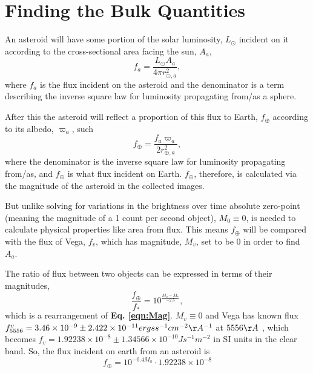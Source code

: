 \documentclass[10pt,twocolumn]{revtex4}    %
\newcommand*{\astrosun}{{\odot}}
\newcommand*{\earth}{{\oplus}}
\begin{document}
\section{Finding the Bulk Quantities}\label{ssec:findVM}


An asteroid will have some portion of the solar luminosity, $L_\astrosun$ incident on it according to the cross-sectional area facing the sun, $A_{a}$,
\begin{equation}\label{eqn:fluxAsteroid}
    f_{a} = \frac{ L_\astrosun A_{a}}{4\pi r^2_{\astrosun,a}},
\end{equation}
where $f_a$ is the flux incident on the asteroid and the denominator is a term describing the inverse square law for luminosity propagating from/as a sphere.

After this the asteroid will reflect a proportion of this flux to Earth, $f_\earth$ according to its albedo, $\varpi_{a}$, such
\begin{equation}\label{eqn:fluxEarth}
    f_\earth = \frac{f_{a} \varpi_{a}}{2r^2_{\earth,a}},
\end{equation}
where the denominator is the inverse square law for luminosity propagating from/as, and $f_\earth$ is what flux incident on Earth. $f_\earth$, therefore, is calculated via the magnitude of the asteroid in the collected images. 

But unlike solving for variations in the brightness over time absolute zero-point (meaning the magnitude of a 1 count per second object), $M_0 \equiv 0$, is needed to calculate physical properties like area from flux. This means $f_\earth$ will be compared with the flux of Vega, $f_v$, which has magnitude, $M_v$, set to be $0$ in order to find $A_a$.

The ratio of flux between two objects can be expressed in terms of their magnitudes,
\begin{equation}\label{eqn:fluxRatio}
    \frac{f_{\earth}}{f_{*}} = 10^{\frac{M_{a} - M_{*}}{-2.5}},
\end{equation}
which is a rearrangement of \textbf{Eq. \ref{eqn:Mag}}. 
$M_v \equiv 0$ and Vega has known flux $f^v_{5556} = 3.46\times10^{-9} \pm	2.422\times10^{-11}
ergs s^{-1} cm^{-2} \AA^{-1}$ at $5556 \AA$ \textbf{\cite{VegaMag0}}, which becomes $f_v = 1.92238\times10^{-8}\pm 1.34566\times10^{-10} J s^{-1} m^{-2}$ in SI units in the clear band. 
So, the flux incident on earth from an asteroid is
\begin{equation}
    \label{eqn:fluxOnEarth}
    f_\earth = 10^{-0.4M_a} \cdot 1.92238\times10^{-8}
\end{equation}
\end{document}
